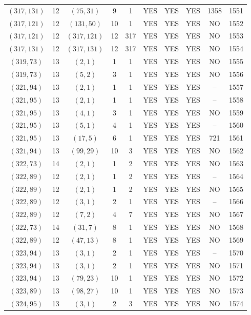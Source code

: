 \begin{longtable}{|c|c|c|c|c|c|c|c|c|c|}
$(317, 131)$ & 12 & $(75, 31)$ & 9 & 1 & YES & YES & YES & 1358 & 1551\\
$(317, 121)$ & 12 & $(131, 50)$ & 10 & 1 & YES & YES & YES & NO & 1552\\
$(317, 121)$ & 12 & $(317, 121)$ & 12 & 317 & YES & YES & YES & NO & 1553\\
$(317, 131)$ & 12 & $(317, 131)$ & 12 & 317 & YES & YES & YES & NO & 1554\\
$(319, 73)$ & 13 & $(2, 1)$ & 1 & 1 & YES & YES & YES & NO & 1555\\
$(319, 73)$ & 13 & $(5, 2)$ & 3 & 1 & YES & YES & YES & NO & 1556\\
$(321, 94)$ & 13 & $(2, 1)$ & 1 & 1 & YES & YES & YES & -- & 1557\\
$(321, 95)$ & 13 & $(2, 1)$ & 1 & 1 & YES & YES & YES & -- & 1558\\
$(321, 95)$ & 13 & $(4, 1)$ & 3 & 1 & YES & YES & YES & NO & 1559\\
$(321, 95)$ & 13 & $(5, 1)$ & 4 & 1 & YES & YES & YES & -- & 1560\\
$(321, 95)$ & 13 & $(17, 5)$ & 6 & 1 & YES & YES & YES & 721 & 1561\\
$(321, 94)$ & 13 & $(99, 29)$ & 10 & 3 & YES & YES & YES & NO & 1562\\
$(322, 73)$ & 14 & $(2, 1)$ & 1 & 2 & YES & YES & YES & NO & 1563\\
$(322, 89)$ & 12 & $(2, 1)$ & 1 & 2 & YES & YES & YES & -- & 1564\\
$(322, 89)$ & 12 & $(2, 1)$ & 1 & 2 & YES & YES & YES & NO & 1565\\
$(322, 89)$ & 12 & $(3, 1)$ & 2 & 1 & YES & YES & YES & -- & 1566\\
$(322, 89)$ & 12 & $(7, 2)$ & 4 & 7 & YES & YES & YES & NO & 1567\\
$(322, 73)$ & 14 & $(31, 7)$ & 8 & 1 & YES & YES & YES & NO & 1568\\
$(322, 89)$ & 12 & $(47, 13)$ & 8 & 1 & YES & YES & YES & NO & 1569\\
$(323, 94)$ & 13 & $(3, 1)$ & 2 & 1 & YES & YES & YES & -- & 1570\\
$(323, 94)$ & 13 & $(3, 1)$ & 2 & 1 & YES & YES & YES & NO & 1571\\
$(323, 94)$ & 13 & $(79, 23)$ & 10 & 1 & YES & YES & YES & NO & 1572\\
$(323, 89)$ & 13 & $(98, 27)$ & 10 & 1 & YES & YES & YES & NO & 1573\\
$(324, 95)$ & 13 & $(3, 1)$ & 2 & 3 & YES & YES & YES & NO & 1574\\

\end{longtable}
